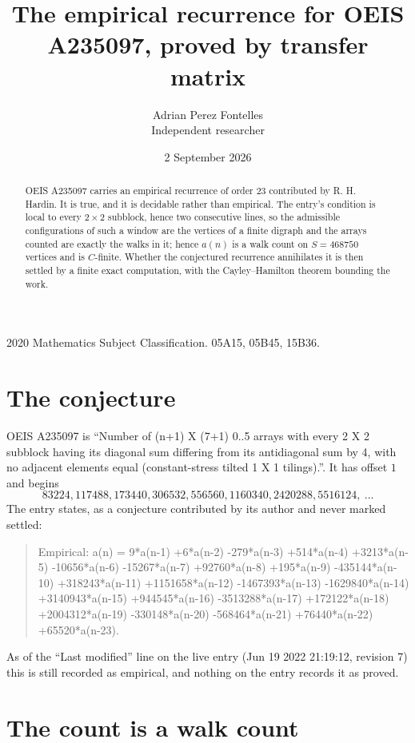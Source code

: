\documentclass[11pt,a4paper]{article}
\title{The empirical recurrence for OEIS A235097, proved by transfer matrix}
\author{Adrian Perez Fontelles\\ \small Independent researcher}
\date{2 September 2026}
\theoremstyle{plain}
\theoremstyle{definition}
\begin{document}
\maketitle

\begin{abstract}
OEIS A235097 carries an empirical recurrence of order $23$ contributed by R. H. Hardin. It is
true, and it is decidable rather than empirical. The entry's condition is local to every $2\times2$ subblock, hence two consecutive lines, so
the admissible configurations of such a window are the vertices of a finite digraph and the
arrays counted are exactly the walks in it; hence $a(n)$ is a walk count on $S=468750$ vertices
and is $C$-finite. Whether the conjectured recurrence annihilates it is then settled by a
finite exact computation, with the Cayley--Hamilton theorem bounding the work.
\end{abstract}

\noindent\small 2020 Mathematics Subject Classification. 05A15, 05B45, 15B36.\normalsize

\section{The conjecture}

OEIS A235097 is ``Number of (n+1) X (7+1) 0..5 arrays with every 2 X 2 subblock having its diagonal sum differing from its antidiagonal sum by 4, with no adjacent elements equal (constant-stress tilted 1 X 1 tilings).''. It has offset $1$ and begins
\[
83224, 117488, 173440, 306532, 556560, 1160340, 2420288, 5516124,\ \dots
\]
The entry states, as a conjecture contributed by its author and never marked settled:
\begin{quote}
Empirical: a(n) = 9*a(n-1) +6*a(n-2) -279*a(n-3) +514*a(n-4) +3213*a(n-5) -10656*a(n-6) -15267*a(n-7) +92760*a(n-8) +195*a(n-9) -435144*a(n-10) +318243*a(n-11) +1151658*a(n-12) -1467393*a(n-13) -1629840*a(n-14) +3140943*a(n-15) +944545*a(n-16) -3513288*a(n-17) +172122*a(n-18) +2004312*a(n-19) -330148*a(n-20) -568464*a(n-21) +76440*a(n-22) +65520*a(n-23).
\end{quote}
As of the ``Last modified'' line on the live entry (Jun 19 2022 21:19:12, revision 7) this is still
recorded as empirical, and nothing on the entry records it as proved.

\section{The count is a walk count}
\end{document}
